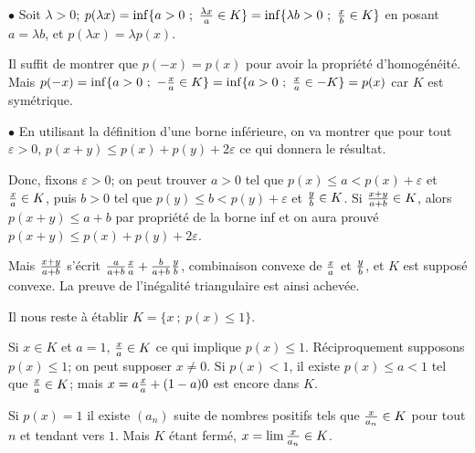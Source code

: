 {\begin{enumerate}
{\smallskip 
 
$\bullet$ Soit $\lambda>0$; $p(\lambda x)=
\inf\{a>0\ ;\ {\lambda x\over a}\in K\}=\inf\{\lambda b>0\ ;\ {x\over
b}\in K\}$ en posant $a=\lambda b$, et $p(\lambda x)=\lambda p(x)$.

Il suffit de montrer que $p(- x)=p(x)$ pour avoir la propriété d'homogénéité.
Mais 
$p(- x)=\inf\{a>0\ ;\ -{ x\over a}\in K\}=\inf\{a>0\ ;\ { x\over a}\in
-K\}=p(x)$ car $K$ est symétrique.

\smallskip

$\bullet$ En utilisant la définition d'une borne inférieure, on va montrer que
pour tout
$\varepsilon>0$,
$p(x+y)\leq p(x)+p(y)+2\varepsilon$ ce qui donnera le résultat.

Donc, fixons $\varepsilon>0$; on peut trouver $a>0$ tel que $p(x)\leq
a<p(x)+\varepsilon$ et ${ x\over a}\in K$, puis $b>0$ tel que $p(y)\leq
b<p(y)+\varepsilon$ et ${y\over b}\in K$. Si ${ x+y\over a+b}\in K$, alors
$p(x+y)\leq a+b$ par propriété de la borne inf et on aura prouvé $p(x+y)\leq
p(x)+p(y)+2\varepsilon$.

Mais ${ x+y\over a+b}$ s'écrit ${ a\over a+b}{x\over a}+{
b\over a+b}{y\over b}$,  combinaison convexe de ${ x\over a}$ et ${ y\over b}$,
et $K$ est supposé convexe. La preuve de l'inégalité triangulaire est ainsi
achevée.

\smallskip

Il nous reste à établir $K=\{x\ ;\ p(x)\leq 1\}$. 

Si $x\in K$ et $a=1$, ${ x\over
a}\in K$ ce qui implique $p(x)\leq 1$. 
 Réciproquement supposons $ p(x)\leq 1$;
on peut supposer $x\not=0$. Si $p(x)<1$, il existe $p(x)\leq a<1$ tel que
${x\over a}\in K$; mais $x=a{x\over a}+(1-a)0$ est encore dans $K$.

Si $p(x)=1$ il existe $(a_n)$ suite de nombres positifs tels
que 
${x\over a_n}\in K$ pour tout $n$ et tendant vers $1$.  Mais $K$ étant fermé,
$x=\lim{x\over a_n}\in K$.}
\end{enumerate}
}
